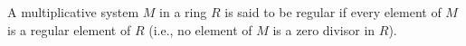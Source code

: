 A multiplicative system $M$ in a ring $R$ is said to be regular if every element of $M$ is a regular element of $R$ (i.e., no element of $M$ is a zero divisor in $R$).
